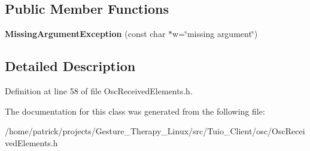 \subsection*{Public Member Functions}
\begin{DoxyCompactItemize}
\item 
\mbox{\label{classosc_1_1_missing_argument_exception_a5e80e3213605298c7712d37c5d30369f}} 
{\bfseries Missing\+Argument\+Exception} (const char $\ast$w=\char`\"{}missing argument\char`\"{})
\end{DoxyCompactItemize}


\subsection{Detailed Description}


Definition at line 58 of file Osc\+Received\+Elements.\+h.



The documentation for this class was generated from the following file\+:\begin{DoxyCompactItemize}
\item 
/home/patrick/projects/\+Gesture\+\_\+\+Therapy\+\_\+\+Linux/src/\+Tuio\+\_\+\+Client/osc/Osc\+Received\+Elements.\+h\end{DoxyCompactItemize}
